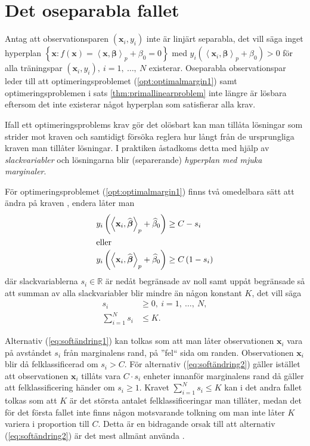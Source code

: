 \documentclass[a4paper, 12pt]{report}
\theoremstyle{definition}
\theoremstyle{remark}
\newcommand{\bfbeta}{{\boldsymbol{\beta}}}
\newcommand{\bfx}{\mathbf{x}}
\newcommand{\llangle}{\left\langle}
\newcommand{\rrangle}{\right\rangle}
\newcommand{\inner}[2]{\llangle #1, #2 \rrangle}
\begin{document}
\section{Det oseparabla fallet}
Antag att observationsparen $\left(\mathbf{x}_i, y_i\right)$ inte är linjärt separabla, det vill säga inget hyperplan $\left\{\mathbf{x} : f\left(\mathbf{x}\right) = \inner{\bfx}{\bfbeta}_p + \beta_0 = 0 \right\}$ med $y_i\left(\inner{\bfx_i}{\bfbeta}_p+\beta_0\right)>0$ för alla träningspar $\left(\mathbf{x}_i, y_i\right),~i=1,~\dots,~N$ existerar. Oseparabla observationspar leder till att optimeringsproblemet (\ref{opt:optimalmargin1}) samt optimeringsproblemen i sats \ref{thm:primallinearproblem} inte längre är lösbara eftersom det inte existerar något hyperplan som satisfierar alla krav.

Ifall ett optimeringsproblems krav gör det olösbart kan man tillåta lösningar som strider mot kraven och samtidigt försöka reglera hur långt från de ursprungliga kraven man tillåter lösningar. I praktiken åstadkoms detta med hjälp av \emph{slackvariabler} och lösningarna blir (separerande) \emph{hyperplan med mjuka marginaler}.

För optimeringsproblemet (\ref{opt:optimalmargin1}) finns två omedelbara sätt att ändra på kraven \cite{ESL}, endera låter man
\begin{align}
	y_i\left(\inner{\bfx_i}{\widehat{\bfbeta}}_p+\widehat{\beta}_0\right) &\geq C-s_i\label{eq:softändring1}\\
	\intertext{eller}
	y_i\left(\inner{\bfx_i}{\widehat{\bfbeta}}_p+\widehat{\beta}_0\right) &\geq C\left(1-s_i\right)\label{eq:softändring2}
\end{align}
där slackvariablerna $s_i\in\mathbb{R}$ är nedåt begränsade av noll samt uppåt begränsade så att summan av alla slackvariabler blir mindre än någon konstant $K$, det vill säga \begin{equation*}
\begin{aligned}
s_i&\geq0,~i=1,~\dots,~N,\\
\sum_{i=1}^{N}s_i&\leq K.
\end{aligned}
\end{equation*}

Alternativ (\ref{eq:softändring1}) kan tolkas som att man låter observationen $\mathbf{x}_i$ vara på avståndet $s_i$ från marginalens rand, på ''fel`` sida om randen. Observationen $\mathbf{x}_i$ blir då felklassificerad om $s_i>C$. För alternativ (\ref{eq:softändring2}) gäller istället att observationen $\mathbf{x}_i$ tillåts vara $C\cdot s_i$ enheter innanför marginalens rand då gäller att felklassificering händer om $s_i\geq1$. Kravet $\sum_{i=1}^{N} s_i \leq K$ kan i det andra fallet tolkas som att $K$ är det största antalet felklassificeringar man tillåter, medan det för det första fallet inte finns någon motsvarande tolkning om man inte låter $K$ variera i proportion till $C$. Detta är en bidragande orsak till att alternativ (\ref{eq:softändring2}) är det mest allmänt använda \cite{ESL}.
\end{document}
